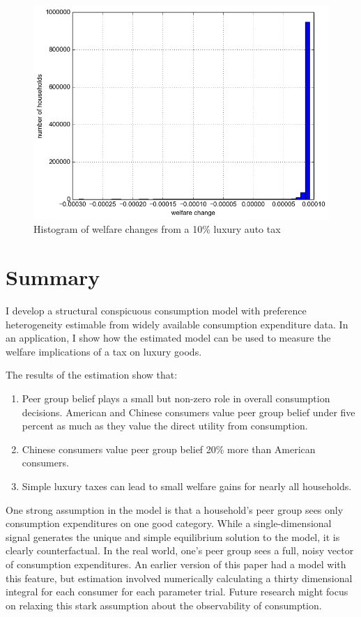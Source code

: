 \documentclass[12pt]{article}
\begin{document}
\begin{figure}
    \centering
	\includegraphics[scale=.6]{pics/tax_hist_Car10.png}
    \caption{Histogram of welfare changes from a 10\% luxury auto tax}
    \label{fig:wel_change_10}
\end{figure}

\section{Summary}
I develop a structural conspicuous consumption model with preference heterogeneity estimable from widely available consumption expenditure data.  In an application, I show how the estimated model can be used to measure the welfare implications of a tax on luxury goods.

The results of the estimation show that:
\begin{enumerate}
    \item Peer group belief plays a small but non-zero role in overall consumption decisions.  American and Chinese consumers value peer group belief under five percent as much as they value the direct utility from consumption.
    \item Chinese consumers value peer group belief 20\% more than American consumers.
    \item Simple luxury taxes can lead to small welfare gains for nearly all households.
\end{enumerate}

One strong assumption in the model is that a household's peer group sees only consumption expenditures on one good category.  While a single-dimensional signal generates the unique and simple equilibrium solution to the model, it is clearly counterfactual.  In the real world, one's peer group sees a full, noisy vector of consumption expenditures.  An earlier version of this paper had a model with this feature, but estimation involved numerically calculating a thirty dimensional integral for each consumer for each parameter trial.  Future research might focus on relaxing this stark assumption about the observability of consumption.
\end{document}
